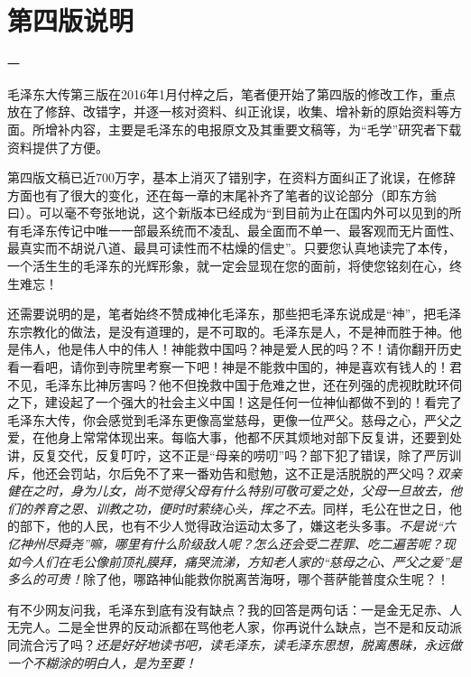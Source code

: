 \documentclass[../../dazhuan.tex]{subfiles}
\begin{document}
\clearpage
\chapter*{第四版说明}

\begin{center}
    \kaishu 一
\end{center}                            
                        
毛泽东大传第三版在2016年1月付梓之后，笔者便开始了第四版的修改工作，重点放在了修辞、改错字，并逐一核对资料、纠正讹误，收集、增补新的原始资料等方面。所增补内容，主要是毛泽东的电报原文及其重要文稿等，为“毛学”研究者下载资料提供了方便。

第四版文稿已近700万字，基本上消灭了错别字，在资料方面纠正了讹误，在修辞方面也有了很大的变化，还在每一章的末尾补齐了笔者的议论部分（即东方翁曰）。可以毫不夸张地说，这个新版本已经成为“到目前为止在国内外可以见到的所有毛泽东传记中唯一一部最系统而不凌乱、最全面而不单一、最客观而无片面性、最真实而不胡说八道、最具可读性而不枯燥的信史”。只要您认真地读完了本传，一个活生生的毛泽东的光辉形象，就一定会显现在您的面前，将使您铭刻在心，终生难忘！

还需要说明的是，笔者始终不赞成神化毛泽东，那些把毛泽东说成是“神”，把毛泽东宗教化的做法，是没有道理的，是不可取的。毛泽东是人，不是神而胜于神。他是伟人，他是伟人中的伟人！神能救中国吗？神是爱人民的吗？不！请你翻开历史看一看吧，请你到寺院里考察一下吧！神是不能救中国的，神是喜欢有钱人的！君不见，毛泽东比神厉害吗？他不但挽救中国于危难之世，还在列强的虎视眈眈环伺之下，建设起了一个强大的社会主义中国！这是任何一位神仙都做不到的！看完了毛泽东大传，你会感觉到毛泽东更像高堂慈母，更像一位严父。慈母之心，严父之爱，在他身上常常体现出来。每临大事，他都不厌其烦地对部下反复讲，还要到处讲，反复交代，反复叮咛，这不正是“母亲的唠叨”吗？部下犯了错误，除了严厉训斥，他还会罚站，尔后免不了来一番劝告和慰勉，这不正是活脱脱的严父吗？\emph{双亲健在之时，身为儿女，尚不觉得父母有什么特别可敬可爱之处，父母一旦故去，他们的养育之恩、训教之功，便时时萦绕心头，挥之不去。}同样，毛公在世之日，他的部下，他的人民，也有不少人觉得政治运动太多了，嫌这老头多事。\emph{不是说“六亿神州尽舜尧”嘛，哪里有什么阶级敌人呢？怎么还会受二茬罪、吃二遍苦呢？现如今人们在毛公像前顶礼膜拜，痛哭流涕，方知老人家的“慈母之心、严父之爱”是多么的可贵！}除了他，哪路神仙能救你脱离苦海呀，哪个菩萨能普度众生呢？！

有不少网友问我，毛泽东到底有没有缺点？我的回答是两句话：一是金无足赤、人无完人。二是全世界的反动派都在骂他老人家，你再说什么缺点，岂不是和反动派同流合污了吗？\emph{还是好好地读书吧，读毛泽东，读毛泽东思想，脱离愚昧，永远做一个不糊涂的明白人，是为至要！}
\end{document}

